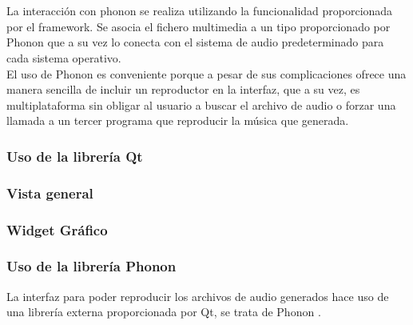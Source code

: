 {\newline
\\
\\La interacción con phonon se realiza utilizando la funcionalidad proporcionada por el framework. Se asocia el fichero multimedia a un tipo proporcionado por Phonon que a su vez lo conecta con el sistema de audio predeterminado para cada sistema operativo.
\\El uso de Phonon es conveniente porque a pesar de sus complicaciones ofrece una manera sencilla de incluir un reproductor en la interfaz, que a su vez, es multiplataforma sin obligar al usuario a buscar el archivo de audio o forzar una llamada a un tercer programa que reproducir la música que generada.

\subsubsection{Uso de la librería Qt}


\subsubsection{Vista general}


\subsubsection{Widget Gráfico}


\subsubsection{Uso de la librería Phonon}


La interfaz para poder reproducir los archivos de audio generados hace uso de una librería externa proporcionada por Qt, se trata de Phonon \cite{phononOverview}. }